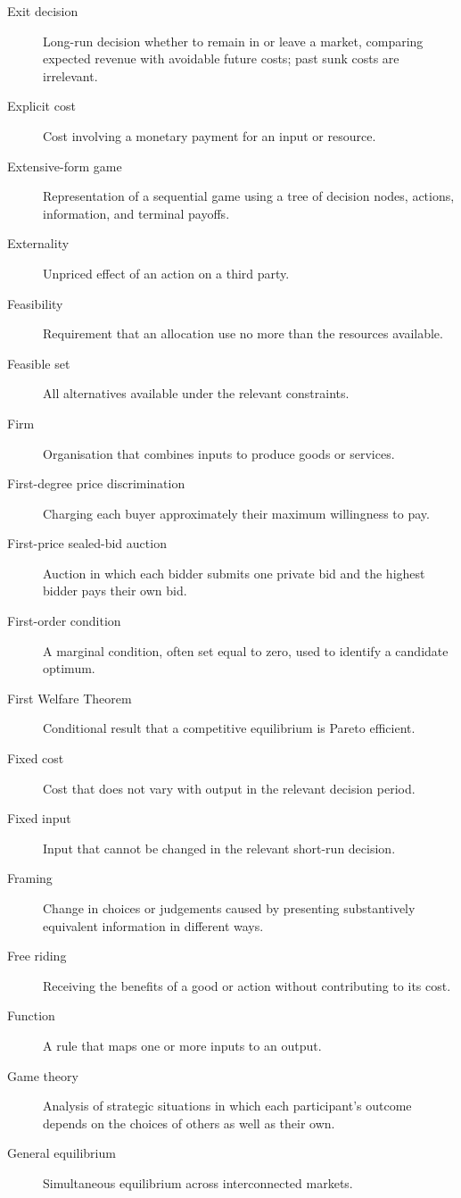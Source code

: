 \begin{description}
  \item[Exit decision] Long-run decision whether to remain in or leave a
  market, comparing expected revenue with avoidable future costs; past sunk
  costs are irrelevant.
  \item[Explicit cost] Cost involving a monetary payment for an input or resource.
  \item[Extensive-form game] Representation of a sequential game using a tree of decision nodes, actions, information, and terminal payoffs.
  \item[Externality] Unpriced effect of an action on a third party.
  \item[Feasibility] Requirement that an allocation use no more than the resources available.
  \item[Feasible set] All alternatives available under the relevant constraints.
  \item[Firm] Organisation that combines inputs to produce goods or services.
  \item[First-degree price discrimination] Charging each buyer approximately their maximum willingness to pay.
  \item[First-price sealed-bid auction] Auction in which each bidder submits one private bid and the highest bidder pays their own bid.
  \item[First-order condition] A marginal condition, often set equal to zero, used to identify a candidate optimum.
  \item[First Welfare Theorem] Conditional result that a competitive equilibrium is Pareto efficient.
  \item[Fixed cost] Cost that does not vary with output in the relevant decision period.
  \item[Fixed input] Input that cannot be changed in the relevant short-run decision.
  \item[Framing] Change in choices or judgements caused by presenting substantively equivalent information in different ways.
  \item[Free riding] Receiving the benefits of a good or action without contributing to its cost.
  \item[Function] A rule that maps one or more inputs to an output.
  \item[Game theory] Analysis of strategic situations in which each participant's outcome depends on the choices of others as well as their own.
  \item[General equilibrium] Simultaneous equilibrium across interconnected markets.

\end{description}
